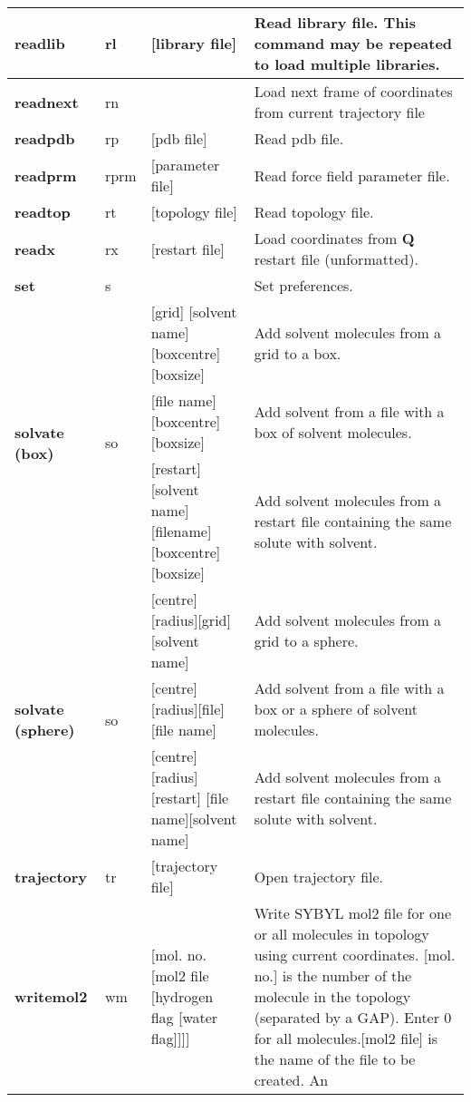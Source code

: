 \documentclass[a4paper,10pt]{article}
\begin{document}
\begin{longtable}{|p{58pt}|p{27pt}|p{110pt}|p{170pt}|}
\hline \bf{readlib}     & rl & [library file]      & Read library file. This command may be repeated to load
                                                     multiple libraries.  \\
\hline \bf{readnext}    & rn &                     & Load next frame of coordinates from current trajectory file\\
\hline \bf{readpdb}     & rp & [pdb file]          & Read pdb file. \\
\hline \bf{readprm}     & rprm & [parameter file]   &  Read force field parameter file. \\
\hline \bf{readtop}     & rt & [topology file]     & Read topology file. \\
\hline \bf{readx}       & rx & [restart file]      & Load coordinates from \textbf{Q} restart file (unformatted).\\
\hline \bf{set}         & s  &                     & Set preferences.  \\
\hline \multirow{3}{58pt}{\bf{solvate (box)}} & \multirow{3}{27pt}{so} & [grid] [solvent name] [boxcentre] [boxsize]
& Add solvent molecules from a grid to a box. \\
\cline{3-4}             &    & [file name] [boxcentre] [boxsize] & Add solvent from a file with a box of solvent molecules.\\
\cline{3-4}             &    & [restart] [solvent
name][filename][boxcen\-tre][boxsize] & Add solvent molecules from a
restart file containing the same solute with solvent.\\
\hline \multirow{3}{58pt}{\bf{solvate (sphere)}} &
\multirow{3}{27pt}{so} & [centre][radius][grid]
[solvent name] & Add solvent molecules from a grid to a sphere.\\
\cline{3-4} &  & [centre][radius][file][file name]                  & Add solvent from a file with a box or a sphere of solvent molecules.\\
\cline{3-4} &  & [centre][radius][restart]
[file name][solvent name] & Add solvent molecules from a restart file containing the same solute with solvent.\\
\hline \bf{trajectory}    & tr & [trajectory file]      & Open trajectory file.\\
\hline \bf{writemol2} & wm & [mol. no. [mol2 file [hydrogen flag
[water flag]]]] & Write SYBYL mol2 file for one or all molecules
in topology using current coordinates. [mol. no.] is the number of
the molecule in the topology (separated by a GAP). Enter 0 for all
molecules.[mol2 file] is the name of the file to be created. An

\end{longtable}
\end{document}
